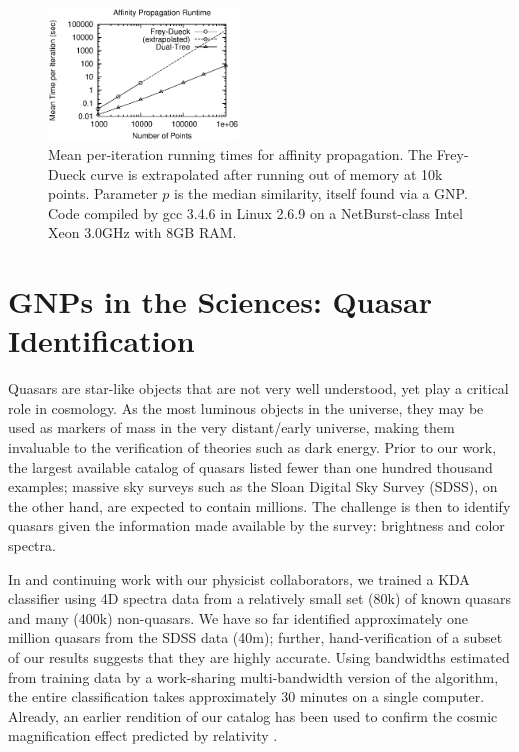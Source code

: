 \documentclass[twoside,leqno,twocolumn]{article}
\begin{document}
\begin{figure}[tb]
  \begin{center}
    \includegraphics[width=0.45\textwidth]{r-speed.ps}
  \end{center}
  \vspace{-10pt}
  \caption{\label{fig:ap-speed}\footnotesize Mean per-iteration
    running times for affinity propagation.  The Frey-Dueck curve is
    extrapolated after running out of memory at 10k points.
    Parameter $p$ is the median similarity, itself found via a GNP.
    Code compiled by gcc 3.4.6 in Linux 2.6.9 on a NetBurst-class
    Intel Xeon 3.0GHz with 8GB RAM.}
\end{figure}

\section{GNPs in the Sciences: Quasar Identification}
Quasars are star-like objects that are not very well understood, yet
play a critical role in cosmology.  As the most luminous objects in
the universe, they may be used as markers of mass in the very
distant/early universe, making them invaluable to the verification of
theories such as dark energy.  Prior to our work, the largest
available catalog of quasars listed fewer than one hundred thousand
examples; massive sky surveys such as the Sloan Digital Sky Survey
(SDSS), on the other hand, are expected to contain millions.  The
challenge is then to identify quasars given the information made
available by the survey: brightness and color spectra.

In \cite{richards04} and continuing work with our physicist
collaborators, we trained a KDA classifier using 4D spectra data from
a relatively small set (80k) of known quasars and many (400k)
non-quasars.  We have so far identified approximately one million
quasars from the SDSS data (40m); further, hand-verification of a
subset of our results suggests that they are highly accurate.  Using
bandwidths estimated from training data by a work-sharing
multi-bandwidth version of the algorithm, the entire classification
takes approximately 30 minutes on a single computer.  Already, an
earlier rendition of our catalog has been used to confirm the cosmic
magnification effect predicted by relativity \cite{nature05}.
\end{document}
